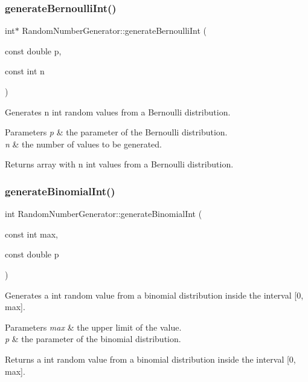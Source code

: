 \subsubsection{\texorpdfstring{generateBernoulliInt()}{generateBernoulliInt()}\hspace{0.1cm}{\footnotesize\ttfamily [2/2]}}
{\footnotesize\ttfamily int$\ast$ Random\+Number\+Generator\+::generate\+Bernoulli\+Int (\begin{DoxyParamCaption}\item[{const double}]{p,  }\item[{const int}]{n }\end{DoxyParamCaption})}

Generates n int random values from a Bernoulli distribution. 
\begin{DoxyParams}{Parameters}
{\em p} & the parameter of the Bernoulli distribution. \\
\hline
{\em n} & the number of values to be generated. \\
\hline
\end{DoxyParams}
\begin{DoxyReturn}{Returns}
array with n int values from a Bernoulli distribution. 
\end{DoxyReturn}
\mbox{\label{class_random_number_generator_a417f97fb1a4362621b60107d98c3b4e7}} 
\subsubsection{\texorpdfstring{generateBinomialInt()}{generateBinomialInt()}\hspace{0.1cm}{\footnotesize\ttfamily [1/2]}}
{\footnotesize\ttfamily int Random\+Number\+Generator\+::generate\+Binomial\+Int (\begin{DoxyParamCaption}\item[{const int}]{max,  }\item[{const double}]{p }\end{DoxyParamCaption})}

Generates a int random value from a binomial distribution inside the interval \mbox{[}0, max\mbox{]}. 
\begin{DoxyParams}{Parameters}
{\em max} & the upper limit of the value. \\
\hline
{\em p} & the parameter of the binomial distribution. \\
\hline
\end{DoxyParams}
\begin{DoxyReturn}{Returns}
a int random value from a binomial distribution inside the interval \mbox{[}0, max\mbox{]}. 
\end{DoxyReturn}
\mbox{\label{class_random_number_generator_a5b95ab4b064f39c8bdbb14af938efc0e}} 
